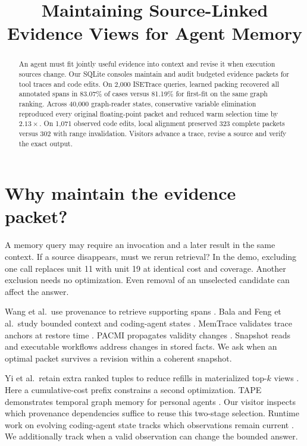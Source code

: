 \documentclass[conference]{IEEEtran}
\title{Maintaining Source-Linked Evidence Views for Agent Memory}
\author{}
\begin{document}
\maketitle
\begin{abstract}
An agent must fit jointly useful evidence into context and revise it when execution sources change. Our SQLite consoles maintain and audit budgeted evidence packets for tool traces and code edits. On 2,000 ISETrace queries, learned packing recovered all annotated spans in 83.07\% of cases versus 81.19\% for first-fit on the same graph ranking. Across 40,000 graph-reader states, conservative variable elimination reproduced every original floating-point packet and reduced warm selection time by $2.13\times$. On 1,071 observed code edits, local alignment preserved 323 complete packets versus 302 with range invalidation. Visitors advance a trace, revise a source and verify the exact output.

\end{abstract}

\section{Why maintain the evidence packet?}

A memory query may require an invocation and a later result in the same context. If a source disappears, must we rerun retrieval? In the demo, excluding one call replaces unit 11 with unit 19 at identical cost and coverage. Another exclusion needs no optimization. Even removal of an unselected candidate can affect the answer.

Wang et al.\ use provenance to retrieve supporting spans \cite{wang}. Bala and Feng et al.\ study bounded context and coding-agent states \cite{bala,feng}. MemTrace validates trace anchors at restore time \cite{memtrace}. PACMI propagates validity changes \cite{pacmi}. Snapshot reads \cite{readboundaries} and executable workflows \cite{changes} address changes in stored facts. We ask when an optimal packet survives a revision within a coherent snapshot.

Yi et al.\ retain extra ranked tuples to reduce refills in materialized top-$k$ views \cite{topk}. Here a cumulative-cost prefix constrains a second optimization. TAPE demonstrates temporal graph memory for personal agents \cite{tape}. Our visitor inspects which provenance dependencies suffice to reuse this two-stage selection. Runtime work on evolving coding-agent state tracks which observations remain current \cite{execledger}. We additionally track when a valid observation can change the bounded answer.
\end{document}
